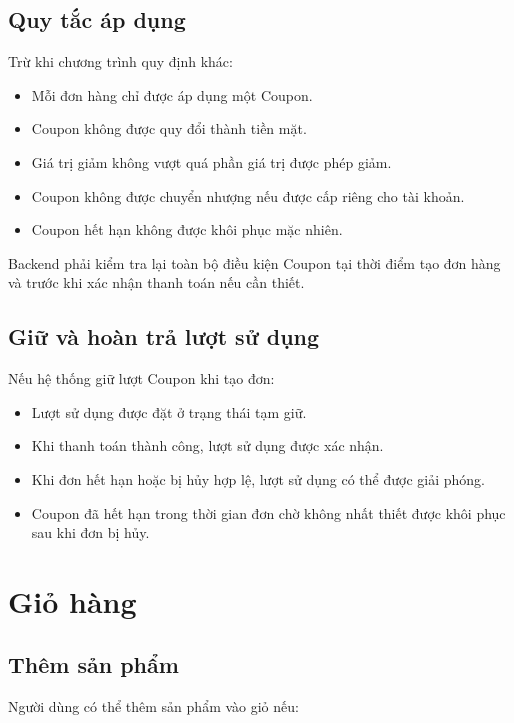 \documentclass[12pt,a4paper]{article}
\begin{document}
\subsection{Quy tắc áp dụng}

Trừ khi chương trình quy định khác:

\begin{itemize}
    \item Mỗi đơn hàng chỉ được áp dụng một Coupon.
    \item Coupon không được quy đổi thành tiền mặt.
    \item Giá trị giảm không vượt quá phần giá trị được phép giảm.
    \item Coupon không được chuyển nhượng nếu được cấp riêng cho tài khoản.
    \item Coupon hết hạn không được khôi phục mặc nhiên.
\end{itemize}

Backend phải kiểm tra lại toàn bộ điều kiện Coupon tại thời điểm tạo đơn hàng
và trước khi xác nhận thanh toán nếu cần thiết.

\subsection{Giữ và hoàn trả lượt sử dụng}

Nếu hệ thống giữ lượt Coupon khi tạo đơn:

\begin{itemize}
    \item Lượt sử dụng được đặt ở trạng thái tạm giữ.
    \item Khi thanh toán thành công, lượt sử dụng được xác nhận.
    \item Khi đơn hết hạn hoặc bị hủy hợp lệ,
    lượt sử dụng có thể được giải phóng.
    \item Coupon đã hết hạn trong thời gian đơn chờ
    không nhất thiết được khôi phục sau khi đơn bị hủy.
\end{itemize}

\section{Giỏ hàng}

\subsection{Thêm sản phẩm}

Người dùng có thể thêm sản phẩm vào giỏ nếu:
\end{document}
